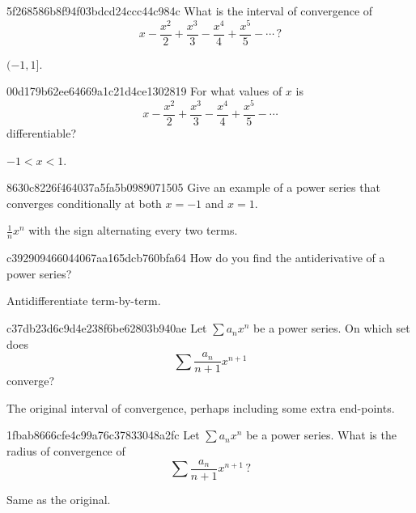 \begin{note}{5f268586b8f94f03bdcd24ccc44c984c}
    What is the interval of convergence of
    \[
        x - \frac{x^2}{2} + \frac{x^3}{3} - \frac{x^4}{4} + \frac{x^5}{5} - \cdots\,?
    \]

    \begin{cloze}{1}
        \({ (-1, 1] }\).
    \end{cloze}
\end{note}

\begin{note}{00d179b62ee64669a1c21d4ce1302819}
    For what values of \({ x }\) is
    \[
        x - \frac{x^2}{2} + \frac{x^3}{3} - \frac{x^4}{4} + \frac{x^5}{5} - \cdots
    \]
    differentiable?

    \begin{cloze}{1}
        \({ -1 < x < 1 }\).
    \end{cloze}
\end{note}

\begin{note}{8630c8226f464037a5fa5b0989071505}
    Give an example of a power series that converges conditionally at both \({ x = -1 }\) and \({ x = 1 }\).

    \begin{cloze}{1}
        \({ \frac{1}{n} x^{n} }\) with the sign alternating every two terms.
    \end{cloze}
\end{note}

\begin{note}{c392909466044067aa165dcb760bfa64}
    How do you find the antiderivative of a power series?

    \begin{cloze}{1}
        Antidifferentiate term-by-term.
    \end{cloze}
\end{note}

\begin{note}{c37db23d6c9d4e238f6be62803b940ae}
    Let \({ \sum a_n x^{n} }\) be a power series.
    On which set does
    \[
        \sum \frac{a_n}{n+1}x^{n+1}
    \]
    converge?

    \begin{cloze}{1}
        The original interval of convergence, perhaps including some extra end-points.
    \end{cloze}
\end{note}

\begin{note}{1fbab8666cfe4c99a76c37833048a2fc}
    Let \({ \sum a_n x^{n} }\) be a power series.
    What is the radius of convergence of
    \[
        \sum \frac{a_n}{n+1}x^{n+1}\,?
    \]

    \begin{cloze}{1}
        Same as the original.
    \end{cloze}
\end{note}

